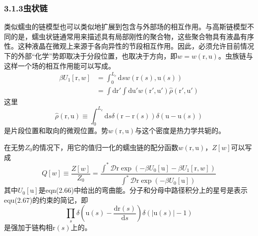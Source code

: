 \subsubsection{3.1.3虫状链}
类似蠕虫的链模型也可以类似地扩展到包含与外部场的相互作用。与高斯链模型不同的是，蠕虫状链通常用来描述具有局部刚性的聚合物，这些聚合物具有液晶有序性。这种液晶在微观上来源于各向异性的节段相互作用。因此，必须允许目前情况下的外部“化学”势即取决于分段位置，也取决于方向，即$w=w(\mathrm{r},\mathrm{u})$。虫族链与这样一个场的相互作用能可以写成。
\begin{equation}
\begin{aligned}
\beta U_1[\mathrm{r},w]&=\int_0^{L_c}\mathrm{d}sw(\mathrm{r}(s),\mathrm{u}(s))\\
&=\int\mathrm{d}\mathrm{r}'\int\mathrm{d}\mathrm{u}'w(\mathrm{r}',\mathrm{u}')\hat{\rho}(\mathrm{r}',\mathrm{u}')
\end{aligned}
\end{equation}
这里
\begin{equation}
\hat{\rho}(\mathrm{r},\mathrm{u})\equiv\int_0^{L_c}\mathrm{d}s\delta(\mathrm{r}-\mathrm{r}(s))\delta(\mathrm{u}-\mathrm{u}(s))
\end{equation}
是片段位置和取向的微观位置。势$w(\mathrm{r},\mathrm{u})$与这个密度是热力学共轭的。

在无势$Z_0$的情况下，用它的值归一化的蠕虫链的配分函数$w(\mathrm{r},\mathrm{u})$，$Z[w]$可以写成
\begin{equation}
Q[w]\equiv\frac{Z[w]}{Z_0}=\frac{\int^*\mathcal{D}\mathrm{r}\exp(-\beta U_0[\mathrm{u}]-\beta U_1[\mathrm{r},w])}{\int^*\mathcal{D}\mathrm{r}\exp(-\beta U_0[\mathrm{u}])}
\end{equation}
其中$U_0[\mathrm{u}]$是eqn(2.66)中给出的弯曲能。分子和分母中路径积分上的星号是表示equ(2.67)的约束的简记，即
\begin{equation}
\prod\limits_s\delta\left(\mathrm{u}(s)-\frac{\mathrm{d}\mathrm{r}(s)}{\mathrm{d}s}\right)\delta(\left|\mathrm{u}(s)\right|-1)
\end{equation}
是强加于链构相$\mathrm{r}(s)$上的。

